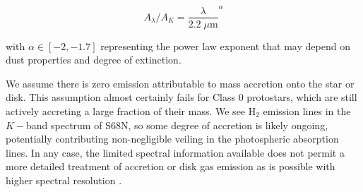\documentclass[twocolumn]{emulateapj}%
\begin{document}
$$ A_\lambda / A_K = \frac{\lambda}{2.2 \; \mu\mathrm{m}}^\alpha$$

with $\alpha \in [-2, -1.7]$ representing the power law exponent that may depend on dust properties and degree of extinction.

We assume there is zero emission attributable to mass accretion onto the star or disk.  This assumption almost certainly fails for Class 0 protostars, which are still actively accreting a large fraction of their mass.  We see H$_2$ emission lines in the $K-$band spectrum of S68N, so some degree of accretion is likely ongoing, potentially contributing non-negligible veiling in the photospheric absorption lines.  In any case, the limited spectral information available does not permit a more detailed treatment of accretion or disk gas emission as is possible with higher spectral resolution \citep[\emph{e.g.}]{2016ApJ...826..179L}.  
\end{document}

